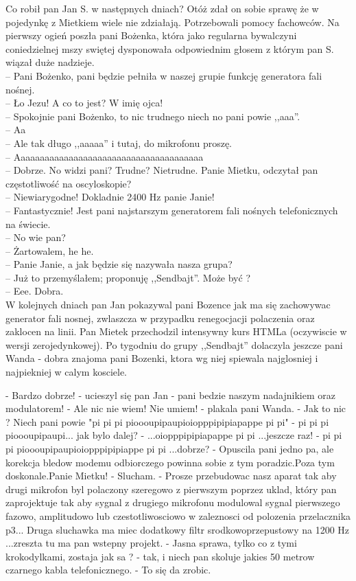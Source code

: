 \documentclass[a4paper,polish,titlepage,12pt]{article}
\begin{document}
Co robił pan Jan S. w następnych dniach? Otóż zdał on sobie sprawę że w pojedynkę z Mietkiem wiele nie zdziałają. Potrzebowali pomocy fachowców. Na pierwszy ogień poszła 
pani Bożenka, która jako regularna bywalczyni coniedzielnej mszy swiętej dysponowała odpowiednim głosem z którym pan S. wiązał duże nadzieje.\\
-- Pani Bożenko, pani będzie pełniła w naszej grupie funkcję generatora fali nośnej.\\
-- Ło Jezu! A co to jest? W imię ojca!\\
-- Spokojnie pani Bożenko, to nic trudnego niech no pani powie ,,aaa''.\\
-- Aa\\
-- Ale tak długo ,,aaaaa'' i tutaj, do mikrofonu proszę.\\
-- Aaaaaaaaaaaaaaaaaaaaaaaaaaaaaaaaaaaaaaa\\
-- Dobrze. No widzi pani? Trudne? Nietrudne. Panie Mietku, odczytał pan częstotliwość na oscyloskopie?\\
-- Niewiarygodne! Dokladnie 2400 Hz panie Janie!\\
-- Fantastycznie! Jest pani najstarszym generatorem fali nośnych telefonicznych na świecie.\\
-- No wie pan?\\
-- Żartowalem, he he.\\
-- Panie Janie, a jak będzie się nazywała nasza grupa?\\
-- Już to przemyślałem; proponuję ,,Sendbajt''. Może być ?\\
-- Eee. Dobra.\\

W kolejnych dniach pan Jan pokazywal pani Bozence jak ma się zachowywac generator fali nosnej, zwlaszcza w przypadku renegocjacji polaczenia oraz zaklocen na linii. Pan Mietek przechodzil intensywny kurs HTMLa (oczywiscie w wersji zerojedynkowej). Po tygodniu do grupy ,,Sendbajt'' dolaczyla jeszcze pani Wanda - dobra znajoma pani Bozenki, ktora wg niej spiewala najglosniej i najpiekniej w calym kosciele.

- Bardzo dobrze! - ucieszyl się pan Jan - pani bedzie naszym nadajnikiem oraz modulatorem!
- Ale nic nie wiem! Nie umiem! - plakala pani Wanda.
- Jak to nic ? Niech pani powie "pi pi pi pioooupipaupioiopppipipiapappe pi pi"
- pi pi pi pioooupipaupi... jak bylo dalej?
- ...oiopppipipiapappe pi pi ...jeszcze raz!
- pi pi pi pioooupipaupioiopppipipiappe pi pi ...dobrze?
- Opuscila pani jedno pa, ale korekcja bledow modemu odbiorczego powinna sobie z tym poradzic.Poza tym doskonale.Panie Mietku!
- Slucham.
- Prosze przebudowac nasz aparat tak aby drugi mikrofon byl polaczony szeregowo z pierwszym poprzez uklad, który pan zaprojektuje tak aby sygnal z drugiego mikrofonu modulowal sygnal pierwszego fazowo, amplitudowo lub czestotliwosciowo w zaleznosci od polozenia przelacznika p3... Druga sluchawka ma miec dodatkowy filtr srodkowoprzepustowy na 1200 Hz ...zreszta tu ma pan wstepny projekt.
- Jasna sprawa, tylko co z tymi krokodylkami, zostaja jak sa ?
- tak, i niech pan skoluje jakies 50 metrow czarnego kabla telefonicznego.
- To się da zrobic.
\end{document}
